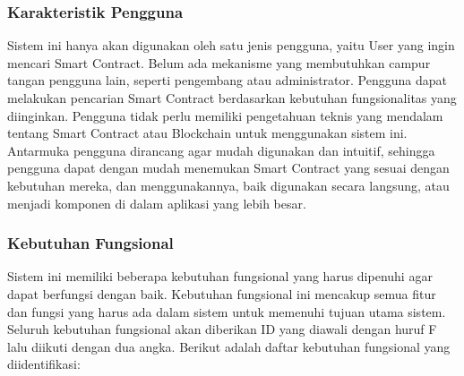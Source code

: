 \subsubsection{Karakteristik Pengguna}

Sistem ini hanya akan digunakan oleh satu jenis pengguna, yaitu User yang ingin mencari Smart Contract. Belum ada mekanisme yang membutuhkan campur tangan pengguna lain, seperti pengembang atau administrator. Pengguna dapat melakukan pencarian Smart Contract berdasarkan kebutuhan fungsionalitas yang diinginkan. Pengguna tidak perlu memiliki pengetahuan teknis yang mendalam tentang Smart Contract atau Blockchain untuk menggunakan sistem ini. Antarmuka pengguna dirancang agar mudah digunakan dan intuitif, sehingga pengguna dapat dengan mudah menemukan Smart Contract yang sesuai dengan kebutuhan mereka, dan menggunakannya, baik digunakan secara langsung, atau menjadi komponen di dalam aplikasi yang lebih besar.

\subsubsection{Kebutuhan Fungsional}

Sistem ini memiliki beberapa kebutuhan fungsional yang harus dipenuhi agar dapat berfungsi dengan baik. Kebutuhan fungsional ini mencakup semua fitur dan fungsi yang harus ada dalam sistem untuk memenuhi tujuan utama sistem. Seluruh kebutuhan fungsional akan diberikan ID yang diawali dengan huruf F lalu diikuti dengan dua angka. Berikut adalah daftar kebutuhan fungsional yang diidentifikasi:

